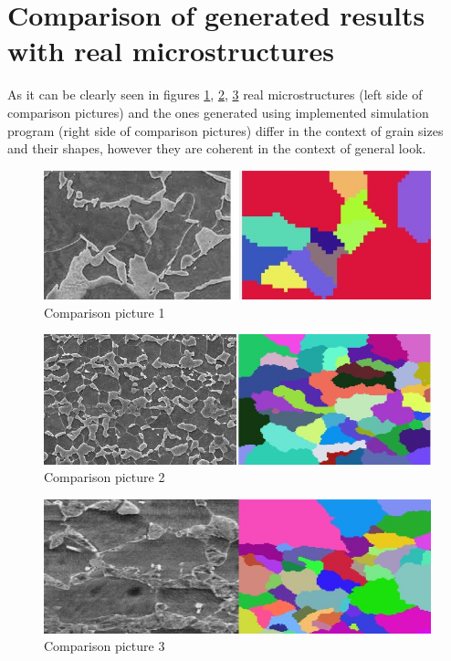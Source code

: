 \documentclass[a4paper, 11pt]{article}
\begin{document}
\section*{Comparison of generated results with real microstructures}
As it can be clearly seen in figures \ref{Comparison1Label}, \ref{Comparison2Label}, \ref{Comparison3Label} real microstructures (left side of comparison pictures) and the ones generated using implemented simulation program (right side of comparison pictures) differ in the context of grain sizes and their shapes, however they are coherent in the context of general look.  
\begin{figure}[H]
\centering
  \includegraphics[width=\textwidth]{Comparison1}
  \caption{Comparison picture 1}
  \label{Comparison1Label}
\end{figure}

\begin{figure}[H]
\centering
  \includegraphics[width=\textwidth]{Comparison2}
  \caption{Comparison picture 2}
  \label{Comparison2Label}
\end{figure}

\begin{figure}[H]
\centering
  \includegraphics[width=\textwidth]{Comparison3}
  \caption{Comparison picture 3}
  \label{Comparison3Label}
\end{figure}
\end{document}
